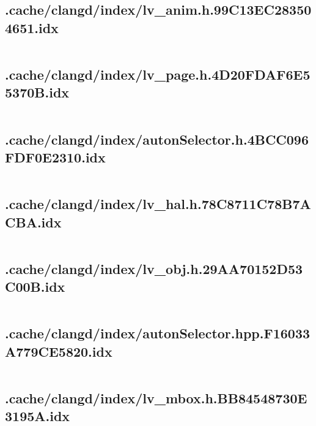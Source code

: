 \subsection{.cache/clangd/index/lv_anim.h.99C13EC283504651.idx}
\inputminted[linenos,tabsize=2,breaklines, breakanywhere]{c}{lv_anim.h.99C13EC283504651.idx}
\pagebreak

\subsection{.cache/clangd/index/lv_page.h.4D20FDAF6E55370B.idx}
\inputminted[linenos,tabsize=2,breaklines, breakanywhere]{c}{lv_page.h.4D20FDAF6E55370B.idx}
\pagebreak

\subsection{.cache/clangd/index/autonSelector.h.4BCC096FDF0E2310.idx}
\inputminted[linenos,tabsize=2,breaklines, breakanywhere]{c}{autonSelector.h.4BCC096FDF0E2310.idx}
\pagebreak

\subsection{.cache/clangd/index/lv_hal.h.78C8711C78B7ACBA.idx}
\inputminted[linenos,tabsize=2,breaklines, breakanywhere]{c}{lv_hal.h.78C8711C78B7ACBA.idx}
\pagebreak

\subsection{.cache/clangd/index/lv_obj.h.29AA70152D53C00B.idx}
\inputminted[linenos,tabsize=2,breaklines, breakanywhere]{c}{lv_obj.h.29AA70152D53C00B.idx}
\pagebreak

\subsection{.cache/clangd/index/autonSelector.hpp.F16033A779CE5820.idx}
\inputminted[linenos,tabsize=2,breaklines, breakanywhere]{c}{autonSelector.hpp.F16033A779CE5820.idx}
\pagebreak

\subsection{.cache/clangd/index/lv_mbox.h.BB84548730E3195A.idx}
\inputminted[linenos,tabsize=2,breaklines, breakanywhere]{c}{lv_mbox.h.BB84548730E3195A.idx}
\pagebreak

